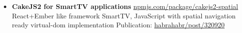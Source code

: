 \documentclass[a4paper,11pt]{article}
\begin{document}
{\begin{itemize}[itemsep=4pt,label=]
  \item \textbf{CakeJS2 for SmartTV applications} \href{https://www.npmjs.com/package/cakejs2-spatial}{npmjs.com/package/cakejs2-spatial}\\
    React+Ember like framework \hfill   SmartTV, JavaScript \break
    with spatial navigation ready virtual-dom implementation\hfill\break
    Publication: \href{https://habrahabr.ru/post/320920/}{habrahabr/post/320920}

\end{itemize}
%
%

%
%
%
%
%
%



%
%

}
\end{document}
